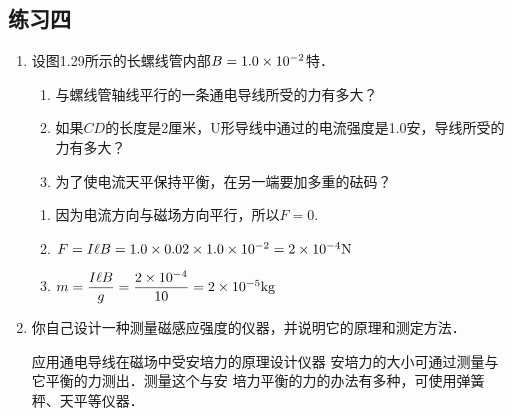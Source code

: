 \subsection{练习四}
\begin{enumerate}
    \item 设图1.29所示的长螺线管内部$B=1.0\times10^{-2}$特．
    \begin{enumerate}
        \item 与螺线管轴线平行的一条通电导线所受的力有多大？
        \item 如果$CD$的长度是2厘米，U形导线中通过的电流强度是1.0安，导线所受的力有多大？
        \item 为了使电流天平保持平衡，在另一端要加多重的砝码？
    \end{enumerate}


    \begin{solution}
\begin{enumerate}
    \item 因为电流方向与磁场方向平行，所以$F=0$.
    \item $F=I\ell B=1.0\times0.02\times1.0\times10^{-2}=2\times10^{-4}{\rm N}$
    \item $m=\dfrac{I\ell B}{g}=\dfrac{2\times10^{-4}}{10}=2\times10^{-5}{\rm kg}$
\end{enumerate}

    \end{solution}
    
    \item 你自己设计一种测量磁感应强度的仪器，并说明它的原理和测定方法．

    \begin{solution}
    应用通电导线在磁场中受安培力的原理设计仪器
安培力的大小可通过测量与它平衡的力测出．测量这个与安
培力平衡的力的办法有多种，可使用弹簧秤、天平等仪器．
    \end{solution}
    
\end{enumerate}




